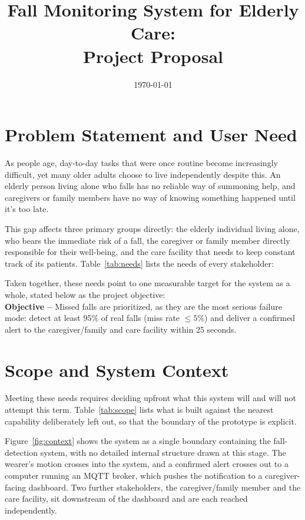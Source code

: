 \documentclass[conference,onecolumn]{IEEEtran}
\title{Fall Monitoring System for Elderly Care:\\ Project Proposal}
\author{
    \IEEEauthorblockN{Gianluca D'Altorio}
    \IEEEauthorblockA{Department of Computer Engineering Technology\\
    Vanier College}
}\date{\today}
\begin{document}
\maketitle

\section{Problem Statement and User Need}
\label{sec:problem}

As people age, day-to-day tasks that were once routine become increasingly difficult, yet many older adults choose to live independently despite this. An elderly person living alone who falls has no reliable way of summoning help, and caregivers or family members have no way of knowing something happened until it's too late.

This gap affects three primary groups directly: the elderly individual living alone, who bears the immediate risk of a fall, the caregiver or family member directly responsible for their well-being, and the care facility that needs to keep constant track of its patients. Table~\ref{tab:needs} lists the needs of every stakeholder:



Taken together, these needs point to one measurable target for the system as a whole, stated below as the project objective:\\

\textbf{Objective --} Missed falls are prioritized, as they are the most serious failure mode: detect at least $95\%$ of real falls (miss rate $\leq 5\%$) and deliver a confirmed alert to the caregiver/family and care facility within 25 seconds.

\section{Scope and System Context}
\label{sec:scope}

Meeting these needs requires deciding upfront what this system will and will not attempt this term. Table~\ref{tab:scope} lists what is built against the nearest capability deliberately left out, so that the boundary of the prototype is explicit.



Figure~\ref{fig:context} shows the system as a single boundary containing the fall-detection system, with no detailed internal structure drawn at this stage. The wearer's motion crosses into the system, and a confirmed alert crosses out to a computer running an MQTT broker, which pushes the notification to a caregiver-facing dashboard. Two further stakeholders, the caregiver/family member and the care facility, sit downstream of the dashboard and are each reached independently.
\end{document}
